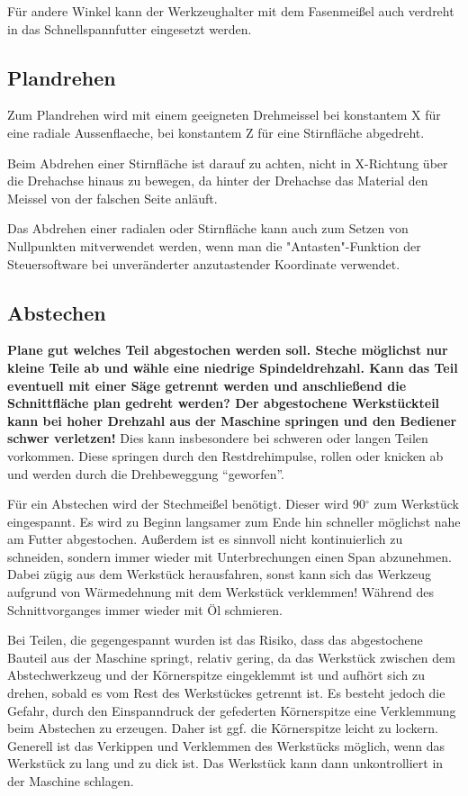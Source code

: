 \documentclass{\basedir/fablab-document}
\begin{document}
Für andere Winkel kann der Werkzeughalter mit dem Fasenmeißel auch verdreht in das Schnellspannfutter eingesetzt werden.

\subsection{Plandrehen}
\label{handdrehen:Plandrehen}

Zum Plandrehen wird mit einem geeigneten Drehmeissel bei konstantem X für eine radiale Aussenflaeche, bei konstantem Z für eine Stirnfläche abgedreht.

Beim Abdrehen einer Stirnfläche ist darauf zu achten, nicht in X-Richtung über die Drehachse hinaus zu bewegen, da hinter der Drehachse das Material den Meissel von der falschen Seite anläuft.

Das Abdrehen einer radialen oder Stirnfläche kann auch zum Setzen von Nullpunkten mitverwendet werden, wenn man die "Antasten"-Funktion der Steuersoftware bei unveränderter anzutastender Koordinate verwendet.

\subsection{Abstechen}

\textbf{Plane gut welches Teil abgestochen werden soll. Steche möglichst nur kleine Teile ab und wähle eine niedrige Spindeldrehzahl. Kann das Teil eventuell mit einer Säge getrennt werden und anschließend die Schnittfläche plan gedreht werden? Der abgestochene Werkstückteil kann bei hoher Drehzahl aus der Maschine springen und den Bediener schwer verletzen!} Dies kann insbesondere bei schweren oder langen Teilen vorkommen. Diese springen durch den Restdrehimpulse, rollen oder knicken ab und werden durch die Drehbeweggung \enquote{geworfen}.

Für ein Abstechen wird der Stechmeißel benötigt.
Dieser wird 90$^\circ$ zum Werkstück eingespannt.
Es wird zu Beginn langsamer zum Ende hin schneller möglichst nahe am Futter abgestochen.
Außerdem ist es sinnvoll nicht kontinuierlich zu schneiden, sondern immer wieder mit Unterbrechungen einen Span abzunehmen.
Dabei zügig aus dem Werkstück herausfahren, sonst kann sich das Werkzeug aufgrund von Wärmedehnung mit dem Werkstück verklemmen!
Während des Schnittvorganges immer wieder mit Öl schmieren.

Bei Teilen, die gegengespannt wurden ist das Risiko, dass das abgestochene Bauteil aus der Maschine springt, relativ gering, da das Werkstück zwischen dem Abstechwerkzeug und der Körnerspitze eingeklemmt ist und aufhört sich zu drehen, sobald es vom Rest des Werkstückes getrennt ist. Es besteht jedoch die Gefahr, durch den Einspanndruck der gefederten Körnerspitze eine Verklemmung beim Abstechen zu erzeugen. Daher ist ggf. die Körnerspitze leicht zu lockern. Generell ist das Verkippen und Verklemmen des Werkstücks möglich, wenn das Werkstück zu lang und zu dick ist. Das Werkstück kann dann unkontrolliert in der Maschine schlagen.
\end{document}
